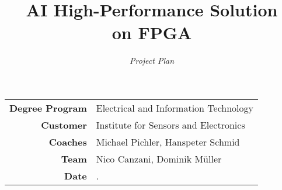 \documentclass[final]{fhnwreport}
\title{\textbf{{\Huge AI High-Performance Solution \\[2mm] on FPGA}}}
\author{\textit{{\LARGE Project Plan}}}
\date{}
\begin{document}
\maketitle
\vfill
\begin{center}
	\begin{tabular}{>{\bfseries\large}rl}
		Degree Program	& Electrical and Information Technology \\[2mm]
		Customer		& Institute for Sensors and Electronics \\[2mm]
		Coaches			& Michael Pichler, Hanspeter Schmid \\[2mm]
		Team			& Nico Canzani, Dominik M\"uller \\[2mm]
		Date			& \the\day.\MONTH \the\year
	\end{tabular}
\end{center}
\clearpage

\tableofcontents
\clearpage









\end{document}
